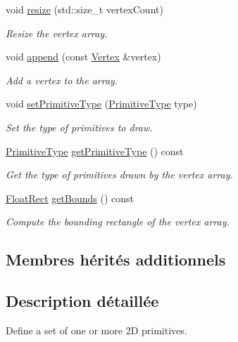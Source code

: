 \begin{DoxyCompactItemize}
void \hyperlink{classsf_1_1VertexArray_a0c0fe239e8f9a54e64d3bbc96bf548c0}{resize} (std\+::size\+\_\+t vertex\+Count)
\begin{DoxyCompactList}\small\item\em Resize the vertex array. \end{DoxyCompactList}\item 
void \hyperlink{classsf_1_1VertexArray_a80c8f6865e53bd21fc6cb10fffa10035}{append} (const \hyperlink{classsf_1_1Vertex}{Vertex} \&vertex)
\begin{DoxyCompactList}\small\item\em Add a vertex to the array. \end{DoxyCompactList}\item 
void \hyperlink{classsf_1_1VertexArray_aa38c10707c28a97f4627ae8b2f3ad969}{set\+Primitive\+Type} (\hyperlink{group__graphics_ga5ee56ac1339984909610713096283b1b}{Primitive\+Type} type)
\begin{DoxyCompactList}\small\item\em Set the type of primitives to draw. \end{DoxyCompactList}\item 
\hyperlink{group__graphics_ga5ee56ac1339984909610713096283b1b}{Primitive\+Type} \hyperlink{classsf_1_1VertexArray_aa1a60d84543aa6e220683349b645f130}{get\+Primitive\+Type} () const
\begin{DoxyCompactList}\small\item\em Get the type of primitives drawn by the vertex array. \end{DoxyCompactList}\item 
\hyperlink{classsf_1_1Rect}{Float\+Rect} \hyperlink{classsf_1_1VertexArray_abd57744c732abfc7d4c98d8e1d4ccca1}{get\+Bounds} () const
\begin{DoxyCompactList}\small\item\em Compute the bounding rectangle of the vertex array. \end{DoxyCompactList}\end{DoxyCompactItemize}
\subsection*{Membres hérités additionnels}


\subsection{Description détaillée}
Define a set of one or more 2D primitives. 

